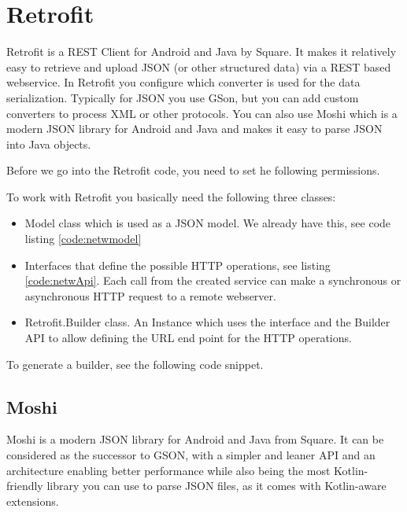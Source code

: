 \section{Retrofit}
Retrofit is a REST Client for Android and Java by Square.
It makes it relatively easy to retrieve and upload JSON (or other structured data) via a REST based webservice.
In Retrofit you configure which converter is used for the data serialization.
Typically for JSON you use GSon, but you can add custom converters to process XML or other protocols.
You can also use Moshi which is a modern JSON library for Android and Java and makes it easy to parse JSON into Java objects.

Before we go into the Retrofit code, you need to set he following permissions. 



To work with Retrofit you basically need the following three classes:
\begin{itemize}
	\item Model class which is used as a JSON model. We already have this, see code listing \ref{code:netwmodel}
	\item Interfaces that define the possible HTTP operations, see listing \ref{code:netwApi}.
	Each call from the created service can make a synchronous or asynchronous HTTP request to a remote webserver.
	\item Retrofit.Builder class. An Instance which uses the interface and the Builder API to allow defining the URL end point for the HTTP operations.
\end{itemize}




To generate a builder, see the following code snippet.





\subsection{Moshi}
\label{sec:moshi}
Moshi is a modern JSON library for Android and Java from Square. It can be considered as the successor to GSON, with a simpler and leaner API and an architecture enabling better performance while also being the most Kotlin-friendly library you can use to parse JSON files, as it comes with Kotlin-aware extensions.

